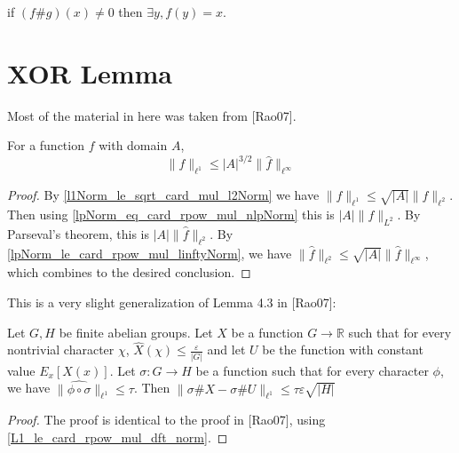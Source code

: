 \begin{proposition}
    \label{transfer_ne_zero}
    \leanok
    if $(f \# g) (x) \neq 0$ then $\exists y, f(y) = x$.
\end{proposition}

\chapter{XOR Lemma}
\label{chap:xorlemma}

Most of the material in here was taken from [Rao07].

\begin{theorem}
    \label{L1_le_card_rpow_mul_dft_norm}
    \leanok
    For a function $f$ with domain $A$,
    $$\lVert f \rVert_{\ell^1} \leq |A|^{3/2} \lVert \hat f \rVert_{\ell^\infty}$$
\end{theorem}

\begin{proof}
    \leanok
    By \ref{l1Norm_le_sqrt_card_mul_l2Norm} we have $\lVert f \rVert_{\ell^1} \leq \sqrt{|A|} \lVert f \rVert_{\ell^2}$.
    Then using \ref{lpNorm_eq_card_rpow_mul_nlpNorm} this is $|A| \lVert f \rVert_{L^2}$. By Parseval's theorem,
    this is $|A| \lVert \hat f \rVert_{\ell^2}$. By \ref{lpNorm_le_card_rpow_mul_linftyNorm}, we have 
    $\lVert \hat f \rVert_{\ell^2} \leq \sqrt{|A|} \lVert \hat f \rVert_{\ell^\infty}$, which combines to the desired conclusion.
\end{proof}

\begin{lemma}
    \label{lemma43}
    \leanok
    This is a very slight generalization of Lemma 4.3 in [Rao07]:

    Let $G, H$ be finite abelian groups. Let $X$ be a function $G \to \mathbb{R}$ such that for every nontrivial character $\chi$,
    $\hat{X}(\chi) \leq \frac{\varepsilon}{|G|}$ and let $U$ be the function with constant value $E_x[X(x)]$. Let $\sigma: G \to H$ be a
    function such that for every character $\phi$, we have $\lVert \widehat{\phi \circ \sigma} \rVert_{\ell^1} \leq \tau$.
    Then $\lVert \sigma \# X - \sigma \# U \rVert_{\ell^1} \leq \tau \varepsilon \sqrt{|H|}$
\end{lemma}

\begin{proof}
    \leanok
    The proof is identical to the proof in [Rao07], using \ref{L1_le_card_rpow_mul_dft_norm}.
\end{proof}


